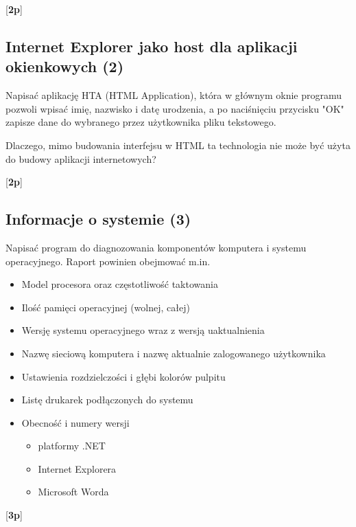       [{\bf 2p}]
      
\subsection{Internet Explorer jako host dla aplikacji okienkowych (2)}

      Napisać aplikację HTA (HTML Application), która w głównym oknie programu pozwoli wpisać
\label{aplikacja_hta}	  
      imię, nazwisko i datę urodzenia, a po naciśnięciu przycisku "OK" zapisze
      dane do wybranego przez użytkownika pliku tekstowego.
      
      Dlaczego, mimo budowania interfejsu w HTML ta technologia nie
      może być użyta do budowy aplikacji internetowych?
      
      [{\bf 2p}] 
      
\subsection{Informacje o systemie (3)}

      Napisać program do diagnozowania komponentów komputera i systemu operacyjnego. 
\label{informacje_o_systemie}	  
      Raport powinien obejmować m.in.
      \begin{itemize}
      \item Model procesora oraz częstotliwość taktowania 
      \item Ilość pamięci operacyjnej (wolnej, całej)
      \item Wersję systemu operacyjnego wraz z wersją uaktualnienia 
      \item Nazwę sieciową komputera i nazwę aktualnie zalogowanego użytkownika
      \item Ustawienia rozdzielczości i głębi kolorów pulpitu
      \item Listę drukarek podłączonych do systemu
      \item Obecność i numery wersji
            \begin{itemize}
            \item platformy .NET
            \item Internet Explorera
            \item Microsoft Worda
            \end{itemize}
      \end{itemize} 

      [{\bf 3p}] 
      
